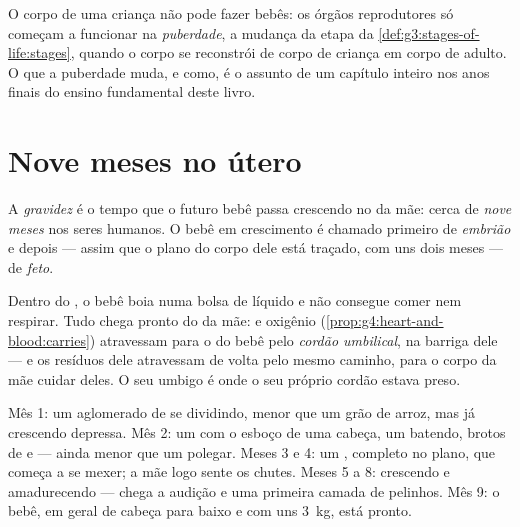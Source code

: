 \begin{remark}\label{rem:g5:human-reproduction:adults}
O corpo de uma criança não pode fazer bebês: os órgãos reprodutores
só começam a funcionar na \emph{puberdade}, a mudança da etapa
 da \cref{def:g3:stages-of-life:stages}, quando o corpo se
reconstrói de corpo de criança em corpo de adulto. O que a puberdade
muda, e como, é o assunto de um capítulo inteiro nos anos finais do
ensino fundamental deste livro.
\end{remark}

\section{Nove meses no útero}

\begin{definition}[Gravidez]\label{def:g5:human-reproduction:pregnancy}
A \emph{gravidez} é o tempo que o futuro bebê passa
crescendo no  da mãe: cerca de \emph{nove meses} nos seres
humanos. O bebê em crescimento é chamado primeiro de
\emph{embrião} e depois --- assim que o plano do corpo
dele está traçado, com uns dois meses --- de \emph{feto}.
\end{definition}

\begin{proposition}\label{prop:g5:human-reproduction:cord}
Dentro do , o bebê boia numa bolsa de líquido e não consegue
comer nem respirar. Tudo chega pronto do  da mãe:  e
oxigênio (\cref{prop:g4:heart-and-blood:carries}) atravessam para o
 do bebê pelo \emph{cordão umbilical},
na barriga dele --- e os resíduos dele atravessam de volta pelo mesmo
caminho, para o corpo da mãe cuidar deles. O seu umbigo é onde o seu
próprio cordão estava preso.
\end{proposition}
\admitted

\begin{example}\label{ex:g5:human-reproduction:timetable}
Mês 1: um aglomerado de  se dividindo, menor que um grão de
arroz, mas já crescendo depressa. Mês 2: um  com o esboço de
uma cabeça, um  batendo, brotos de  e  --- ainda
menor que um polegar. Meses 3 e 4: um , completo no plano, que
começa a se mexer; a mãe logo sente os chutes. Meses 5 a 8:
crescendo e amadurecendo --- chega a audição e uma primeira camada
de pelinhos. Mês 9: o bebê, em geral de cabeça para baixo e com uns
\qty{3}{kg}, está pronto.
\end{example}

